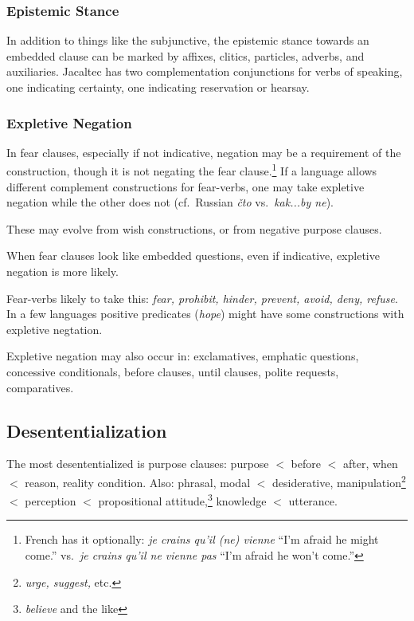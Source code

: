 \documentclass[11pt]{article}
\newcommand{\E}[1]{\textit{#1}}   %
\begin{document}
{\subsubsection{Epistemic Stance}
In addition to things like the subjunctive, the epistemic stance
towards an embedded clause can be marked by affixes, clitics,
particles, adverbs, and auxiliaries.  Jacaltec has two complementation
conjunctions for verbs of speaking, one indicating certainty, one
indicating reservation or hearsay.

\subsubsection{Expletive Negation}
In fear clauses, especially if not indicative, negation may be a
requirement of the construction, though it is not negating the fear
clause.\footnote{French has it optionally: \E{je crains qu'il (ne)
    vienne} ``I'm afraid he might come.'' vs.\ \E{je crains qu'il ne
    vienne pas} ``I'm afraid he won't come.''}  If a language allows
different complement constructions for fear-verbs, one may take
expletive negation while the other does not (cf.\ Russian \E{čto}
vs.\ \E{kak...by ne}).

These may evolve from wish constructions, or from negative
purpose clauses.

When fear clauses look like embedded questions, even if indicative,
expletive negation is more likely.

Fear-verbs likely to take this: \E{fear, prohibit, hinder, prevent,
  avoid, deny, refuse}.  In a few languages positive predicates
(\E{hope}) might have some constructions with expletive negtation.

Expletive negation may also occur in: exclamatives, emphatic
questions, concessive conditionals, before clauses, until clauses,
polite requests, comparatives.


\subsection{Desententialization}
The most desententialized is purpose clauses: purpose $<$ before $<$
after, when $<$ reason, reality condition.  Also: phrasal, modal $<$
desiderative, manipulation\footnote{\textit{urge, suggest,} etc.} $<$
perception $<$ propositional attitude,\footnote{\textit{believe} and
the like} knowledge $<$ utterance.

}
\end{document}
